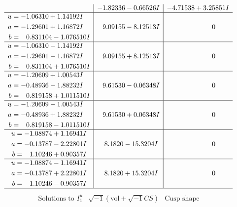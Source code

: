 \documentclass[1p]{elsarticle_modified}
\theoremstyle{definition}
\newcommand{\I}{\sqrt{-1}}
\begin{document}
$$\begin{array}{c|c|c}
 & -1.82336 - 0.66526 I & -4.71538 + 3.25851 I \\ \hline\begin{aligned}
u &= -1.06310 + 1.14192 I \\
a &= -1.29601 + 1.16872 I \\
b &= \phantom{-}0.831104 - 1.076510 I\end{aligned}
 & \phantom{-}9.09155 - 8.12513 I & \phantom{-0.000000 } 0 \\ \hline\begin{aligned}
u &= -1.06310 - 1.14192 I \\
a &= -1.29601 - 1.16872 I \\
b &= \phantom{-}0.831104 + 1.076510 I\end{aligned}
 & \phantom{-}9.09155 + 8.12513 I & \phantom{-0.000000 } 0 \\ \hline\begin{aligned}
u &= -1.20609 + 1.00543 I \\
a &= -0.48936 - 1.88232 I \\
b &= \phantom{-}0.819158 + 1.011510 I\end{aligned}
 & \phantom{-}9.61530 - 0.06348 I & \phantom{-0.000000 } 0 \\ \hline\begin{aligned}
u &= -1.20609 - 1.00543 I \\
a &= -0.48936 + 1.88232 I \\
b &= \phantom{-}0.819158 - 1.011510 I\end{aligned}
 & \phantom{-}9.61530 + 0.06348 I & \phantom{-0.000000 } 0 \\ \hline\begin{aligned}
u &= -1.08874 + 1.16941 I \\
a &= -0.13787 - 2.22801 I \\
b &= \phantom{-}1.10246 + 0.90357 I\end{aligned}
 & \phantom{-}8.1820 - 15.3204 I & \phantom{-0.000000 } 0 \\ \hline\begin{aligned}
u &= -1.08874 - 1.16941 I \\
a &= -0.13787 + 2.22801 I \\
b &= \phantom{-}1.10246 - 0.90357 I\end{aligned}
 & \phantom{-}8.1820 + 15.3204 I & \phantom{-0.000000 } 0\\
 \hline 
 \end{array}$$\newpage$$\begin{array}{c|c|c}  
\text{Solutions to }I^u_{1}& \I (\text{vol} + \sqrt{-1}CS) & \text{Cusp shape}\\

\end{array}$$
\end{document}
